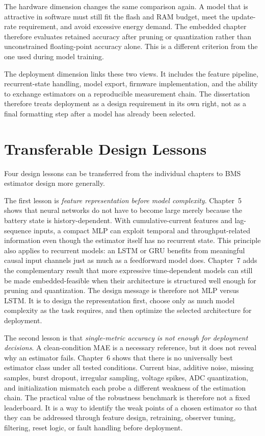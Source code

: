 \documentclass[
    a4paper,
    12pt,
    titlepage,
    bibliography=totoc,
    twoside=on,
    parskip=false,
    numbers=noenddot,
    cleardoublepage=empty,
    DIV=12,
    BCOR=12.0mm,
    headheight=36pt,
    headings=openright
]{scrreprt}
\begin{document}
The hardware dimension changes the same comparison again. A model that is attractive in software must still fit the flash and RAM budget, meet the update-rate requirement, and avoid excessive energy demand. The embedded chapter therefore evaluates retained accuracy after pruning or quantization rather than unconstrained floating-point accuracy alone. This is a different criterion from the one used during model training.

The deployment dimension links these two views. It includes the feature pipeline, recurrent-state handling, model export, firmware implementation, and the ability to exchange estimators on a reproducible measurement chain. The dissertation therefore treats deployment as a design requirement in its own right, not as a final formatting step after a model has already been selected.

\section{Transferable Design Lessons}
Four design lessons can be transferred from the individual chapters to BMS estimator design more generally.

The first lesson is \emph{feature representation before model complexity}. Chapter~5 shows that neural networks do not have to become large merely because the battery state is history-dependent. With cumulative-current features and lag-sequence inputs, a compact MLP can exploit temporal and throughput-related information even though the estimator itself has no recurrent state. This principle also applies to recurrent models: an LSTM or GRU benefits from meaningful causal input channels just as much as a feedforward model does. Chapter~7 adds the complementary result that more expressive time-dependent models can still be made embedded-feasible when their architecture is structured well enough for pruning and quantization. The design message is therefore not MLP versus LSTM. It is to design the representation first, choose only as much model complexity as the task requires, and then optimize the selected architecture for deployment.

The second lesson is that \emph{single-metric accuracy is not enough for deployment decisions}. A clean-condition MAE is a necessary reference, but it does not reveal why an estimator fails. Chapter~6 shows that there is no universally best estimator class under all tested conditions. Current bias, additive noise, missing samples, burst dropout, irregular sampling, voltage spikes, ADC quantization, and initialization mismatch each probe a different weakness of the estimation chain. The practical value of the robustness benchmark is therefore not a fixed leaderboard. It is a way to identify the weak points of a chosen estimator so that they can be addressed through feature design, retraining, observer tuning, filtering, reset logic, or fault handling before deployment.
\end{document}
